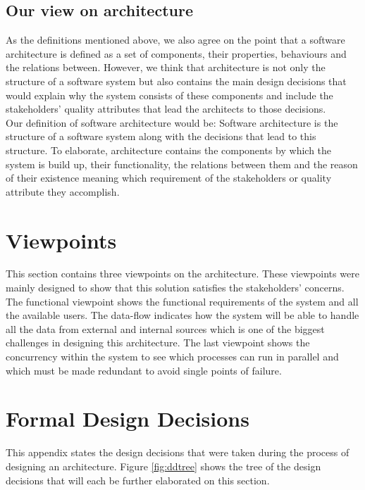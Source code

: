 \documentclass{article}
\begin{document}
\subsection{Our view on architecture}
As the definitions mentioned above, we also agree on the point that a software architecture is defined as a set of components, their properties, behaviours and the relations
between. However, we think that architecture is not only the structure of a software system but also contains the main design decisions that would explain why the system consists of 
these components and include the stakeholders' quality attributes that lead the architects to those decisions. \\ 

Our definition of software architecture would be:
Software architecture is the structure of a software system along with the decisions that lead to this structure. To elaborate, architecture contains the components by which
the system is build up, their functionality, the relations between them and the reason of their existence meaning which requirement of the stakeholders or quality attribute they accomplish. 



\section{Viewpoints}
 \label{sec:viewpoints}
This section contains three viewpoints on the architecture. These viewpoints were mainly designed to show that this solution satisfies the stakeholders' concerns. The functional viewpoint shows the functional requirements of the system and all the available users. The data-flow indicates how the system will be able to handle all the data from external and internal sources which is one of the biggest challenges in designing this architecture. The last viewpoint shows the concurrency within the system to see which processes can run in parallel and which must be made redundant to avoid single points of failure.


%



\appendix
\clearpage

\label{sec:requirements}

\clearpage
\section{Formal Design Decisions}
\label{sec:designdecisions}
This appendix states the design decisions that were taken during the process of designing an architecture. Figure \ref{fig:ddtree} shows the tree of the design decisions that will each be further elaborated on this section.
\end{document}

